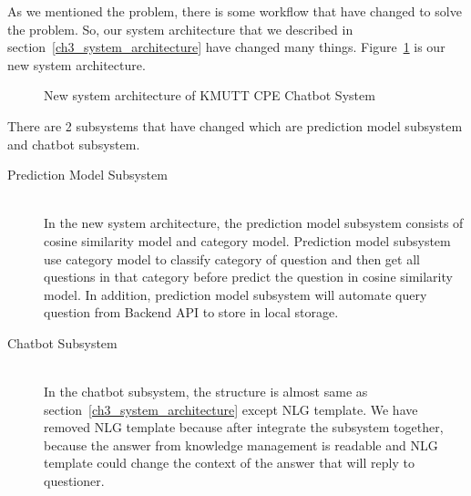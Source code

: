 \documentclass[12pt,oneside,openright,a4paper]{cpe-english-project}
\begin{document}
As we mentioned the problem, there is some workflow that have changed to solve the problem. So, our system architecture that we described in section~\ref*{ch3_system_architecture} have changed many things. Figure~\ref*{fig:new_software_architecture} is our new system architecture.

\begin{figure}[!h]\centering
{}
\caption{New system architecture of KMUTT CPE Chatbot System}
\label{fig:new_software_architecture}
\end{figure}

There are 2 subsystems that have changed which are prediction model subsystem and chatbot subsystem.

\begin{description}
	\item [Prediction Model Subsystem]\hfill \\
	In the new system architecture, the prediction model subsystem consists of cosine similarity model and
	category model. Prediction model subsystem use category model to classify category of question and then
	get all questions in that category before predict the question in cosine similarity model.
	In addition, prediction model subsystem will automate query question from Backend API to store in local storage.
	\item [Chatbot Subsystem]
	\hfill \\
	In the chatbot subsystem, the structure is almost same as section~\ref*{ch3_system_architecture} except NLG template.
	We have removed NLG template because after integrate the subsystem together,
	because the answer from knowledge management is readable and NLG template could change 
	the context of the answer that will reply to questioner.
\end{description}
\end{document}
